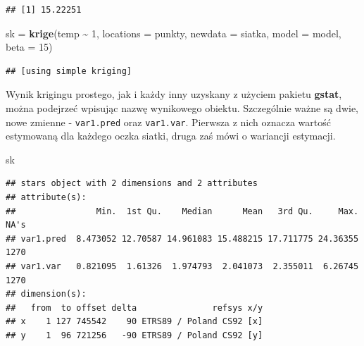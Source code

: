\documentclass[
  paper=6in:9in,pagesize=pdftex,headinclude=on,footinclude=on,10pt]{scrbook}
\newenvironment{Shaded}{\begin{snugshade}}{\end{snugshade}}
\newcommand{\AttributeTok}[1]{\textcolor[rgb]{0.13,0.29,0.53}{#1}}
\newcommand{\DecValTok}[1]{\textcolor[rgb]{0.00,0.00,0.81}{#1}}
\newcommand{\FunctionTok}[1]{\textcolor[rgb]{0.13,0.29,0.53}{\textbf{#1}}}
\newcommand{\NormalTok}[1]{#1}
\newcommand{\OtherTok}[1]{\textcolor[rgb]{0.56,0.35,0.01}{#1}}
\newcommand{\SpecialCharTok}[1]{\textcolor[rgb]{0.81,0.36,0.00}{\textbf{#1}}}
\begin{document}
\begin{Shaded}
\end{Shaded}

\begin{verbatim}
## [1] 15.22251
\end{verbatim}

\begin{Shaded}
\begin{Highlighting}[]
\NormalTok{sk }\OtherTok{=} \FunctionTok{krige}\NormalTok{(temp }\SpecialCharTok{\textasciitilde{}} \DecValTok{1}\NormalTok{, }
            \AttributeTok{locations =}\NormalTok{ punkty,}
            \AttributeTok{newdata =}\NormalTok{ siatka,}
            \AttributeTok{model =}\NormalTok{ model,}
            \AttributeTok{beta =} \DecValTok{15}\NormalTok{)}
\end{Highlighting}
\end{Shaded}

\begin{verbatim}
## [using simple kriging]
\end{verbatim}

Wynik krigingu prostego, jak i każdy inny uzyskany z użyciem pakietu \textbf{gstat}, można podejrzeć wpisując nazwę wynikowego obiektu.
Szczególnie ważne są dwie, nowe zmienne - \texttt{var1.pred} oraz \texttt{var1.var}.
Pierwsza z nich oznacza wartość estymowaną dla każdego oczka siatki, druga zaś mówi o wariancji estymacji.

\begin{Shaded}
\begin{Highlighting}[]
\NormalTok{sk}
\end{Highlighting}
\end{Shaded}

\begin{verbatim}
## stars object with 2 dimensions and 2 attributes
## attribute(s):
##                Min.  1st Qu.    Median      Mean   3rd Qu.     Max. NA's
## var1.pred  8.473052 12.70587 14.961083 15.488215 17.711775 24.36355 1270
## var1.var   0.821095  1.61326  1.974793  2.041073  2.355011  6.26745 1270
## dimension(s):
##   from  to offset delta               refsys x/y
## x    1 127 745542    90 ETRS89 / Poland CS92 [x]
## y    1  96 721256   -90 ETRS89 / Poland CS92 [y]
\end{verbatim}
\end{document}
